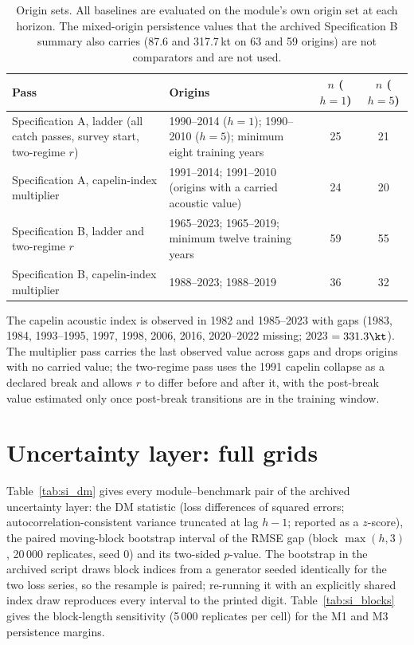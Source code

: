 \begin{table}[!htb]
\centering\small
\caption{Origin sets. All baselines are evaluated on the module's own origin set at each horizon. The mixed-origin persistence values that the archived Specification B summary also carries (87.6 and 317.7\,kt on 63 and 59 origins) are not comparators and are not used.}
\begin{tabularx}{\textwidth}{@{}>{\raggedright\arraybackslash}p{}Lcc@{}}
\toprule
Pass & Origins & $n$ ($h=1$) & $n$ ($h=5$) \\
\midrule
Specification A, ladder (all catch passes, survey start, two-regime $r$) & 1990--2014 ($h=1$); 1990--2010 ($h=5$); minimum eight training years & 25 & 21 \\
Specification A, capelin-index multiplier & 1991--2014; 1991--2010 (origins with a carried acoustic value) & 24 & 20 \\
Specification B, ladder and two-regime $r$ & 1965--2023; 1965--2019; minimum twelve training years & 59 & 55 \\
Specification B, capelin-index multiplier & 1988--2023; 1988--2019 & 36 & 32 \\
\bottomrule
\end{tabularx}
\end{table}

The capelin acoustic index is observed in 1982 and 1985--2023 with gaps (1983, 1984, 1993--1995, 1997, 1998, 2006, 2016, 2020--2022 missing; 2023 $= 331.3\kt$). The multiplier pass carries the last observed value across gaps and drops origins with no carried value; the two-regime pass uses the 1991 capelin collapse as a declared break and allows $r$ to differ before and after it, with the post-break value estimated only once post-break transitions are in the training window.

\FloatBarrier
\section{Uncertainty layer: full grids}\label{si:uncertainty}

Table~\ref{tab:si_dm} gives every module--benchmark pair of the archived uncertainty layer: the DM statistic (loss differences of squared errors; autocorrelation-consistent variance truncated at lag $h-1$; reported as a $z$-score), the paired moving-block bootstrap interval of the RMSE gap (block $\max(h,3)$, 20\,000 replicates, seed 0) and its two-sided $p$-value. The bootstrap in the archived script draws block indices from a generator seeded identically for the two loss series, so the resample is paired; re-running it with an explicitly shared index draw reproduces every interval to the printed digit. Table~\ref{tab:si_blocks} gives the block-length sensitivity (5\,000 replicates per cell) for the M1 and M3 persistence margins.

